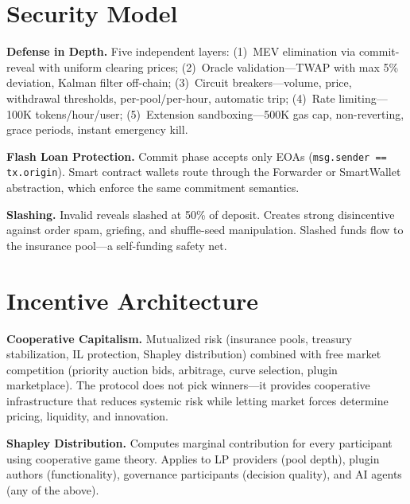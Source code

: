 \documentclass[9pt, letterpaper]{article}
\begin{document}

\section{Security Model}

\textbf{Defense in Depth.} Five independent layers: (1)~MEV elimination via commit-reveal with uniform clearing prices; (2)~Oracle validation---TWAP with max 5\% deviation, Kalman filter off-chain; (3)~Circuit breakers---volume, price, withdrawal thresholds, per-pool/per-hour, automatic trip; (4)~Rate limiting---100K tokens/hour/user; (5)~Extension sandboxing---500K gas cap, non-reverting, grace periods, instant emergency kill.

\textbf{Flash Loan Protection.} Commit phase accepts only EOAs (\texttt{msg.sender == tx.origin}). Smart contract wallets route through the Forwarder or SmartWallet abstraction, which enforce the same commitment semantics.

\textbf{Slashing.} Invalid reveals slashed at 50\% of deposit. Creates strong disincentive against order spam, griefing, and shuffle-seed manipulation. Slashed funds flow to the insurance pool---a self-funding safety net.


\section{Incentive Architecture}

\textbf{Cooperative Capitalism.} Mutualized risk (insurance pools, treasury stabilization, IL protection, Shapley distribution) combined with free market competition (priority auction bids, arbitrage, curve selection, plugin marketplace). The protocol does not pick winners---it provides cooperative infrastructure that reduces systemic risk while letting market forces determine pricing, liquidity, and innovation.

\textbf{Shapley Distribution.} Computes marginal contribution for every participant using cooperative game theory. Applies to LP providers (pool depth), plugin authors (functionality), governance participants (decision quality), and AI agents (any of the above).
\end{document}
